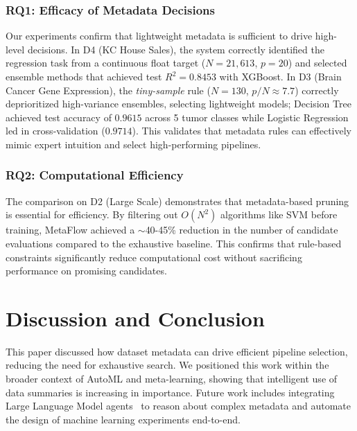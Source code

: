 \documentclass[conference]{IEEEtran}
\begin{document}
   \subsubsection{RQ1: Efficacy of Metadata Decisions}
   Our experiments confirm that lightweight metadata is sufficient to drive high-level decisions. In D4 (KC House Sales), the system correctly identified the regression task from a continuous float target ($N=21{,}613$, $p=20$) and selected ensemble methods that achieved test $R^2 = 0.8453$ with XGBoost. In D3 (Brain Cancer Gene Expression), the \emph{tiny-sample} rule ($N=130$, $p/N \approx 7.7$) correctly deprioritized high-variance ensembles, selecting lightweight models; Decision Tree achieved test accuracy of $0.9615$ across 5 tumor classes while Logistic Regression led in cross-validation ($0.9714$). This validates that metadata rules can effectively mimic expert intuition and select high-performing pipelines.

   \subsubsection{RQ2: Computational Efficiency}
   The comparison on D2 (Large Scale) demonstrates that metadata-based pruning is essential for efficiency. By filtering out $O(N^2)$ algorithms like SVM before training, MetaFlow achieved a $\sim$40-45\% reduction in the number of candidate evaluations compared to the exhaustive baseline. This confirms that rule-based constraints significantly reduce computational cost without sacrificing performance on promising candidates.

   \section{Discussion and Conclusion}
   \label{sec:conclusion}
   This paper discussed how dataset metadata can drive efficient pipeline selection, reducing the need for exhaustive search. We positioned this work within the broader context of AutoML and meta-learning, showing that intelligent use of data summaries is increasing in importance. Future work includes integrating Large Language Model agents~\cite{shen2024hugginggpt} to reason about complex metadata and automate the design of machine learning experiments end-to-end.

   \balance
   
   

   
\end{document}
